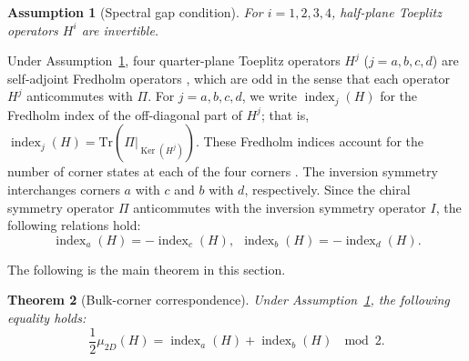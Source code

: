 \documentclass{amsart}
\theoremstyle{plain}
\newtheorem{theorem}{Theorem}[section]
\newtheorem{assumption}[theorem]{Assumption}
\theoremstyle{definition}
\theoremstyle{remark}
\DeclareMathOperator{\ind}{\mathrm{index}}
\DeclareMathOperator{\Ker}{\mathrm{Ker}}
\begin{document}
\begin{assumption}[Spectral gap condition]
\label{assumption2D}
For $i = 1,2,3,4$, half-plane Toeplitz operators $H^i$ are invertible.
\end{assumption}

Under Assumption~\ref{assumption2D}, four quarter-plane Toeplitz operators $H^j$ ($j=a,b,c,d$) are self-adjoint Fredholm operators \cite{DH71}, which are odd in the sense that each operator $H^j$ anticommutes with $\Pi$.
For $j = a,b,c,d$, we write $\ind_j(H)$ for the Fredholm index of the off-diagonal part of $H^j$; that is,
$\ind_j(H) = \mathrm{Tr}(\Pi|_{\Ker(H^j)})$.
These Fredholm indices account for the number of corner states at each of the four corners \cite{Hayashi3}.
The inversion symmetry interchanges corners $a$ with $c$ and $b$ with $d$, respectively.
Since the chiral symmetry operator $\Pi$ anticommutes with the inversion symmetry operator $I$, the following relations hold:
\begin{equation*}
	\ind_a(H) = - \ind_c(H), \ \ \ind_b(H) = - \ind_d(H).
\end{equation*}

The following is the main theorem in this section.

\begin{theorem}[Bulk-corner correspondence]
\label{theorem2D}
Under Assumption~\ref{assumption2D}, the following equality holds:
\begin{equation*}
	\frac{1}{2}\mu_{2D}(H) = \ind_a(H) + \ind_b(H) \ \mod 2.
\end{equation*}
\end{theorem}
\end{document}
